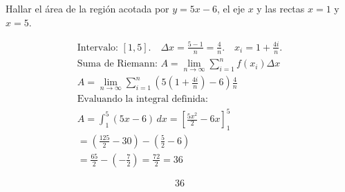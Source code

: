 Hallar el área de la región acotada por $y=5x-6$, el eje $x$ y las rectas $x=1$ y $x=5$.

\nopagebreak
\begin{align*}
\text{Intervalo: } [1,5]. \quad \Delta x = \frac{5-1}{n} = \frac{4}{n}. \quad x_i = 1 + \frac{4i}{n}. \\
\text{Suma de Riemann: } A = \lim_{n \to \infty} \sum_{i=1}^{n} f(x_i) \Delta x \\
A = \lim_{n \to \infty} \sum_{i=1}^{n} \left(5\left(1+\frac{4i}{n}\right)-6\right) \frac{4}{n} \\
\text{Evaluando la integral definida:} \\
A = \int_{1}^{5} (5x-6) \, dx = \left[ \frac{5x^2}{2} - 6x \right]_{1}^{5} \\
= \left(\frac{125}{2} - 30\right) - \left(\frac{5}{2} - 6\right) \\
= \frac{65}{2} - \left(-\frac{7}{2}\right) = \frac{72}{2} = 36
\end{align*}

\[
\boxed{\displaystyle 36}
\]
